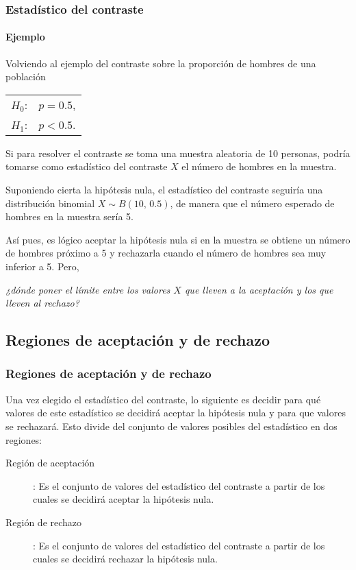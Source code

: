 \begin{frame}
\frametitle{Estadístico del contraste}
\framesubtitle{Ejemplo}
Volviendo al ejemplo del contraste sobre la proporción de hombres de una población
\begin{center}
\begin{tabular}{ll}
$H_0$: & $p=0.5$,\\
$H_1$: & $p<0.5$.
\end{tabular}
\end{center}
Si para resolver el contraste se toma una muestra aleatoria de 10 personas, podría tomarse como estadístico del
contraste $X$ el número de hombres en la muestra.

Suponiendo cierta la hipótesis nula, el estadístico del contraste seguiría una distribución binomial $X\sim
B(10,\,0.5)$, de manera que el número esperado de hombres en la muestra sería 5.

Así pues, es lógico aceptar la hipótesis nula si en la muestra se obtiene un número de hombres próximo a 5 y rechazarla
cuando el número de hombres sea muy inferior a 5. Pero,
\begin{center} 
\emph{¿dónde poner el límite entre los valores $X$ que lleven a la aceptación y los que lleven al rechazo?} 
\end{center}
\end{frame}


\subsection{Regiones de aceptación y de rechazo}
\begin{frame}
\frametitle{Regiones de aceptación y de rechazo}
Una vez elegido el estadístico del contraste, lo siguiente es decidir para qué valores de este estadístico se decidirá
aceptar la hipótesis nula y para que valores se rechazará. Esto divide del conjunto de valores posibles del estadístico
en dos regiones:
\begin{description}
\item[Región de aceptación]: Es el conjunto de valores del estadístico del contraste a partir de los cuales se decidirá
aceptar la hipótesis nula.
\item[Región de rechazo]: Es el conjunto de valores del estadístico del contraste a partir de los cuales se decidirá
rechazar la hipótesis nula. 
\end{description}
\end{frame}


